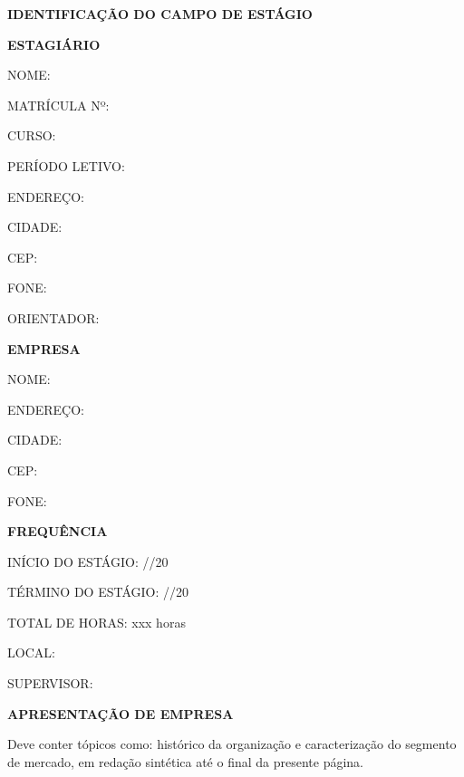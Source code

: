 \vspace{2\ufapelh}
\textocentralizado{\underline{\hspace{7.3cm}}}
\vspace{\ufapelh}
\begingroup\setlength{\parindent}{0pt}
\textbf{IDENTIFICAÇÃO DO CAMPO DE ESTÁGIO}\par
\textbf{ESTAGIÁRIO}\par
NOME:\par MATRÍCULA Nº:\par CURSO:\par PERÍODO LETIVO:\par ENDEREÇO:\par
CIDADE:\par CEP:\par FONE:\par ORIENTADOR:\par
\vspace{\ufapelh}
\textbf{EMPRESA}\par
NOME:\par ENDEREÇO:\par CIDADE:\par CEP:\par FONE:\par
\vspace{\ufapelh}
\textbf{FREQUÊNCIA}\par
INÍCIO DO ESTÁGIO: \hspace{0.6em}/\hspace{1.2em}/20\par
TÉRMINO DO ESTÁGIO: \hspace{0.6em}/\hspace{1.2em}/20\par
TOTAL DE HORAS: xxx horas\par
LOCAL:\par SUPERVISOR:\par
\vspace{\ufapelh}
\textbf{APRESENTAÇÃO DE EMPRESA}\par
\endgroup
\vspace{\ufapelh}
\setlength{\parindent}{1.25cm}
Deve conter tópicos como: histórico da organização e caracterização do
segmento de mercado, em redação sintética até o final da presente página.
